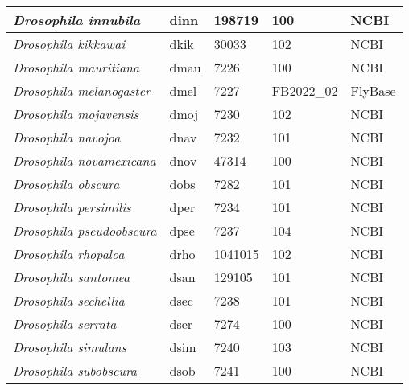\begin{table}[h!]
\begin{tabular}{|l|l|l|l|l|}
\textit{Drosophila innubila}           & dinn                & 198719            & 100              & NCBI            \\ \hline
\textit{Drosophila kikkawai}           & dkik                & 30033             & 102              & NCBI            \\ \hline
\textit{Drosophila mauritiana}         & dmau                & 7226              & 100              & NCBI            \\ \hline
\textit{Drosophila melanogaster}       & dmel                & 7227              & FB2022\_02       & FlyBase         \\ \hline
\textit{Drosophila mojavensis}         & dmoj                & 7230              & 102              & NCBI            \\ \hline
\textit{Drosophila navojoa}            & dnav                & 7232              & 101              & NCBI            \\ \hline
\textit{Drosophila novamexicana}       & dnov                & 47314             & 100              & NCBI            \\ \hline
\textit{Drosophila obscura}            & dobs                & 7282              & 101              & NCBI            \\ \hline
\textit{Drosophila persimilis}         & dper                & 7234              & 101              & NCBI            \\ \hline
\textit{Drosophila pseudoobscura}      & dpse                & 7237              & 104              & NCBI            \\ \hline
\textit{Drosophila rhopaloa}           & drho                & 1041015           & 102              & NCBI            \\ \hline
\textit{Drosophila santomea}           & dsan                & 129105            & 101              & NCBI            \\ \hline
\textit{Drosophila sechellia}          & dsec                & 7238              & 101              & NCBI            \\ \hline
\textit{Drosophila serrata}            & dser                & 7274              & 100              & NCBI            \\ \hline
\textit{Drosophila simulans}           & dsim                & 7240              & 103              & NCBI            \\ \hline
\textit{Drosophila subobscura}         & dsob                & 7241              & 100              & NCBI            \\ \hline

\end{tabular}
\end{table}
